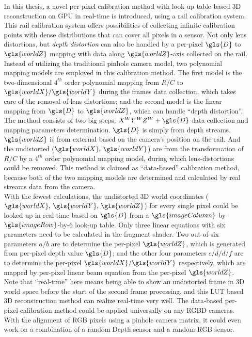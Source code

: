 In this thesis, a novel per-pixel calibration method with look-up table based \gls{3D} reconstruction on \gls{GPU} in real-time is introduced, using a rail calibration system. This rail calibration system offers possibilities of collecting infinite calibration points with dense distributions that can cover all pixels in a sensor. Not only lens distortions, but \emph{depth distortion} can also be handled by a per-pixel \(\gls{D}\) to \(\gls{worldZ}\) mapping with data along \(\gls{worldZ}\)-axis collected on the rail. Instead of utilizing the traditional pinhole camera model, two polynomial mapping models are employed in this calibration method. The first model is the two-dimensional \(4^{th}\) order polynomial mapping from \(R/C\) to \(\gls{worldX}/\gls{worldY}\) during the frames data collection, which takes care of the removal of lens distortions; and the second model is the linear mapping from \(\gls{D}\) to \(\gls{worldZ}\), which can handle \enquote{depth distortion}. The method consists of two big steps: \(X^WY^WZ^W+\gls{D}\) data collection and mapping parameters determination. \(\gls{D}\) is simply from depth streams. \(\gls{worldZ}\) is from external based on the camera's position on the rail. And the undistorted (\(\gls{worldX}, \, \gls{worldY}\)) are from the transformation of \(R/C\) by a \(4^{th}\) order polynomial mapping model, during which lens-distortions could be removed. This method is claimed as \enquote{data-based} calibration method, because both of the two mapping models are determined and calculated by real streams data from the camera. 
\\\indent
With the fewest calculations, the undistorted \gls{3D} world coordinates (\(\gls{worldX}, \, \gls{worldY}, \, \gls{worldZ}\)) for every single pixel could be looked up in real-time based on \(\gls{D}\) from a \(\gls{imageColumn}\)-by-\(\gls{imageRow}\)-by-\(6\) look-up table. Only three linear equations with six parameters need to be calculated in the fragment shader. Two out of six parameters \(a/b\) are to determine the per-pixel \(\gls{worldZ}\), which is generated from per-pixel depth value \(\gls{D}\); and the other four parameters \(c/d/d/f\) are to determine the per-pixel \(\gls{worldX}/\gls{worldY}\) respectively, which are mapped by per-pixel linear beam equation from the per-pixel \(\gls{worldZ}\). Note that \enquote{real-time} here means being able to show an undistorted frame in \gls{3D} world space before the start of the second frame processing, and this \gls{LUT} based \gls{3D} reconstruction method can realize real-time very well. The data-based per-pixel calibration method could be applied universally on any \gls{RGBD} cameras. With the alignment of RGB pixels using a pinhole camera matrix, it could even work on a combination of a random Depth sensor and a random RGB sensor.
